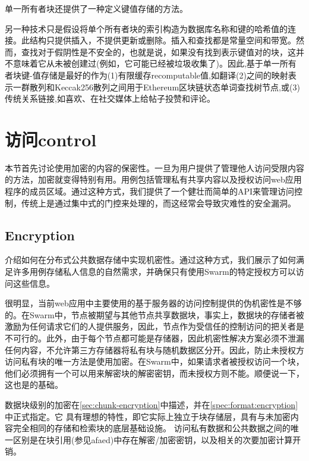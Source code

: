 单一所有者块还提供了一种定义键值存储的方法。

另一种技术只是假设将单个所有者块的索引构造为数据库名称和键的哈希值的连接。此结构只提供插入，不提供更新或删除。插入和查找都是常量空间和带宽。然而，查找对于假阴性是不安全的，也就是说，如果没有找到表示键值对的块，这并不意味着它从未被创建过(例如，它可能已经被垃圾收集了)。因此,基于单一所有者块键-值存储是最好的作为(1)有限缓存recomputable值,如翻译(2)之间的映射表示一群散列和Keccak256散列之间用于Ethereum区块链状态单词查找树节点,或(3)传统关系链接,如喜欢、在社交媒体上给帖子投赞和评论。 


\section{访问control\statusgreen}\label{sec:access-control}

\green{}

本节首先讨论使用加密的内容的保密性。一旦为用户提供了管理他人访问受限内容的方法，加密就变得特别有用。用例包括管理私有共享内容以及授权访问web应用程序的成员区域。通过这种方式，我们提供了一个健壮而简单的API来管理访问控制，传统上是通过集中式的门控来处理的，而这经常会导致灾难性的安全漏洞。

\subsection{Encryption\statusgreen}\label{sec:encryption}

介绍如何在分布式公共数据存储中实现机密性。通过这种方式，我们展示了如何满足许多用例存储私人信息的自然需求，并确保只有使用Swarm的特定授权方可以访问这些信息。 

很明显，当前web应用中主要使用的基于服务器的访问控制提供的伪机密性是不够的。在Swarm中，节点被期望与其他节点共享数据块，事实上，数据块的存储者被激励为任何请求它们的人提供服务，因此，节点作为受信任的控制访问的把关者是不可行的。此外，由于每个节点都可能是存储器，因此机密性解决方案必须不泄漏任何内容，不允许第三方存储器将私有块与随机数据区分开。因此，防止未授权方访问私有块的唯一方法是使用加密。在Swarm中，如果请求者被授权访问一个块，他们必须拥有一个可以用来解密块的解密密钥，而未授权方则不能。顺便说一下，这也是的基础。

数据块级别的加密在\ref{sec:chunk-encryption}中描述，并在\ref{spec:format:encryption}中正式指定。它 
具有理想的特性，即它实际上独立于块存储层，具有与未加密内容完全相同的存储和检索块的底层基础设施。
访问私有数据和公共数据之间的唯一区别是在块引用(参见afaed)中存在解密/加密密钥，以及相关的次要加密计算开销。

